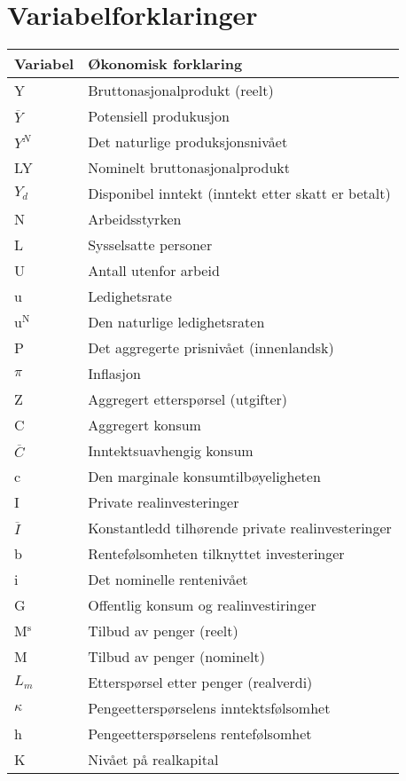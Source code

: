 \documentclass[11pt]{article}
\author{Jørn I. Halvorsen}
\date{\today}
\title{}
\begin{document}
\section*{Variabelforklaringer}
\label{sec:org250c52a}

\begin{center}
\begin{tabular}{ll}
Variabel & Økonomisk forklaring\\
\hline
Y & Bruttonasjonalprodukt (reelt)\\
\(\overline{Y}\) & Potensiell produkusjon\\
\(Y^{N}\) & Det naturlige produksjonsnivået\\
LY & Nominelt bruttonasjonalprodukt\\
\(Y_{d}\) & Disponibel inntekt (inntekt etter skatt er betalt)\\
N & Arbeidsstyrken\\
L & Sysselsatte personer\\
U & Antall utenfor arbeid\\
u & Ledighetsrate\\
u\(^{\text{N}}\) & Den naturlige ledighetsraten\\
P & Det aggregerte prisnivået (innenlandsk)\\
\(\pi\) & Inflasjon\\
Z & Aggregert etterspørsel (utgifter)\\
C & Aggregert konsum\\
\(\overline{C}\) & Inntektsuavhengig konsum\\
c & Den marginale konsumtilbøyeligheten\\
I & Private realinvesteringer\\
\(\overline{I}\) & Konstantledd tilhørende private realinvesteringer\\
b & Rentefølsomheten tilknyttet investeringer\\
i & Det nominelle rentenivået\\
G & Offentlig konsum og realinvestiringer\\
M\(^{\text{s}}\) & Tilbud av penger (reelt)\\
M & Tilbud av penger (nominelt)\\
\(L_{m}\) & Etterspørsel etter penger (realverdi)\\
\(\kappa\) & Pengeetterspørselens inntektsfølsomhet\\
h & Pengeetterspørselens rentefølsomhet\\
K & Nivået på realkapital\\

\end{tabular}
\end{center}
\end{document}
